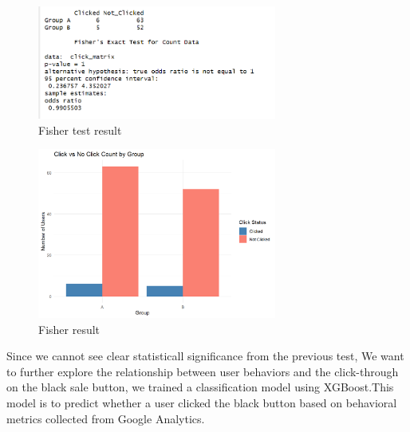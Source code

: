 \documentclass[
  letterpaper,
  DIV=11,
  numbers=noendperiod]{scrartcl}
\begin{document}
\begin{figure}[H]

{\centering \includegraphics[width=0.7\textwidth,height=\textheight]{data_ana_pj3_files/fisher.png}

}

\caption{Fisher test result}

\end{figure}%
\begin{figure}[H]

{\centering \includegraphics[width=0.7\textwidth,height=\textheight]{data_ana_pj3_files/figure-html/unnamed-chunk-7-1.png}

}

\caption{Fisher result}

\end{figure}%

Since we cannot see clear statisticall significance from the previous
test, We want to further explore the relationship between user behaviors
and the click-through on the black sale button, we trained a
classification model using XGBoost.This model is to predict whether a
user clicked the black button based on behavioral metrics collected from
Google Analytics.
\end{document}
